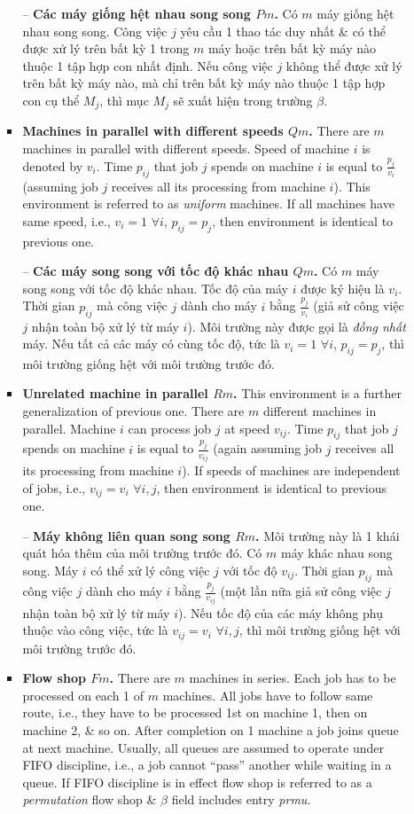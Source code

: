 \documentclass{article}
\begin{document}
\begin{itemize}
\begin{itemize}
\begin{itemize}
            -- {\bf Các máy giống hệt nhau song song $Pm$.} Có $m$ máy giống hệt nhau song song. Công việc $j$ yêu cầu 1 thao tác duy nhất \& có thể được xử lý trên bất kỳ 1 trong $m$ máy hoặc trên bất kỳ máy nào thuộc 1 tập hợp con nhất định. Nếu công việc $j$ không thể được xử lý trên bất kỳ máy nào, mà chỉ trên bất kỳ máy nào thuộc 1 tập hợp con cụ thể $M_j$, thì mục $M_j$ sẽ xuất hiện trong trường $\beta$.
            \item {\bf Machines in parallel with different speeds $Qm$.} There are $m$ machines in parallel with different speeds. Speed of machine $i$ is denoted by $v_i$. Time $p_{ij}$ that job $j$ spends on machine $i$ is equal to $\frac{p_j}{v_i}$ (assuming job $j$ receives all its processing from machine $i$). This environment is referred to as {\it uniform} machines. If all machines have same speed, i.e., $v_i = 1$ $\forall i$, $p_{ij} = p_j$, then environment is identical to previous one.

            -- {\bf Các máy song song với tốc độ khác nhau $Qm$.} Có $m$ máy song song với tốc độ khác nhau. Tốc độ của máy $i$ được ký hiệu là $v_i$. Thời gian $p_{ij}$ mà công việc $j$ dành cho máy $i$ bằng $\frac{p_j}{v_i}$ (giả sử công việc $j$ nhận toàn bộ xử lý từ máy $i$). Môi trường này được gọi là {\it đồng nhất} máy. Nếu tất cả các máy có cùng tốc độ, tức là $v_i = 1$ $\forall i$, $p_{ij} = p_j$, thì môi trường giống hệt với môi trường trước đó.
            \item {\bf Unrelated machine in parallel $Rm$.} This environment is a further generalization of previous one. There are $m$ different machines in parallel. Machine $i$ can process job $j$ at speed $v_{ij}$. Time $p_{ij}$ that job $j$ spends on machine $i$ is equal to $\frac{p_j}{v_{ij}}$ (again assuming job $j$ receives all its processing from machine $i$). If speeds of machines are independent of jobs, i.e., $v_{ij} = v_i$ $\forall i,j$, then environment is identical to previous one.

            -- {\bf Máy không liên quan song song $Rm$.} Môi trường này là 1 khái quát hóa thêm của môi trường trước đó. Có $m$ máy khác nhau song song. Máy $i$ có thể xử lý công việc $j$ với tốc độ $v_{ij}$. Thời gian $p_{ij}$ mà công việc $j$ dành cho máy $i$ bằng $\frac{p_j}{v_{ij}}$ (một lần nữa giả sử công việc $j$ nhận toàn bộ xử lý từ máy $i$). Nếu tốc độ của các máy không phụ thuộc vào công việc, tức là $v_{ij} = v_i$ $\forall i,j$, thì môi trường giống hệt với môi trường trước đó.
            \item {\bf Flow shop $Fm$.} There are $m$ machines in series. Each job has to be processed on each 1 of $m$ machines. All jobs have to follow same route, i.e., they have to be processed 1st on machine 1, then on machine 2, \& so on. After completion on 1 machine a job joins queue at next machine. Usually, all queues are assumed to operate under FIFO discipline, i.e., a job cannot ``pass'' another while waiting in a queue. If FIFO discipline is in effect flow shop is referred to as a {\it permutation} flow shop \& $\beta$ field includes entry {\it prmu}.


\end{itemize}
\end{itemize}
\end{itemize}
\end{document}
